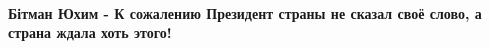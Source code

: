  
 
 
 
 

\paragraph{Бітман Юхим - К сожалению Президент страны не сказал своё слово, а страна ждала хоть этого!}
\label{sec:12_08_2021.fb.buzhanskii_max.1.maguchih.cmt.bitman_juhim_prezident_slovo}

